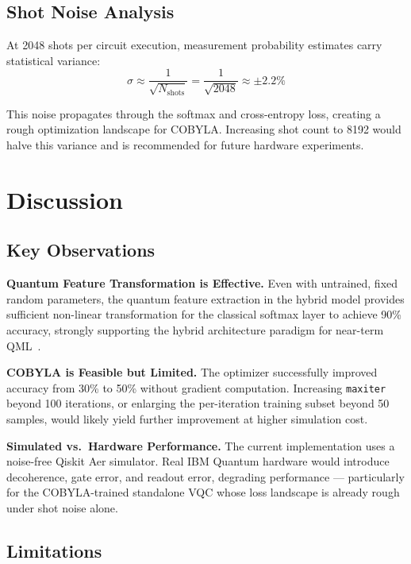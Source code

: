 \documentclass[conference]{IEEEtran}
\begin{document}
\subsection{Shot Noise Analysis}

At 2048 shots per circuit execution, measurement probability estimates carry statistical variance:
\begin{equation}
\sigma \approx \frac{1}{\sqrt{N_{\text{shots}}}} = \frac{1}{\sqrt{2048}} \approx \pm 2.2\%
\label{eq:shotnoise}
\end{equation}

This noise propagates through the softmax and cross-entropy loss, creating a rough optimization landscape for COBYLA. Increasing shot count to 8192 would halve this variance and is recommended for future hardware experiments.

\section{Discussion}

\subsection{Key Observations}

\textbf{Quantum Feature Transformation is Effective.} Even with untrained, fixed random parameters, the quantum feature extraction in the hybrid model provides sufficient non-linear transformation for the classical softmax layer to achieve 90\% accuracy, strongly supporting the hybrid architecture paradigm for near-term QML~\cite{vengathattil2025}.

\textbf{COBYLA is Feasible but Limited.} The optimizer successfully improved accuracy from 30\% to 50\% without gradient computation. Increasing \texttt{maxiter} beyond 100 iterations, or enlarging the per-iteration training subset beyond 50 samples, would likely yield further improvement at higher simulation cost.

\textbf{Simulated vs.\ Hardware Performance.} The current implementation uses a noise-free Qiskit Aer simulator. Real IBM Quantum hardware would introduce decoherence, gate error, and readout error, degrading performance — particularly for the COBYLA-trained standalone VQC whose loss landscape is already rough under shot noise alone.

\subsection{Limitations}
\end{document}
